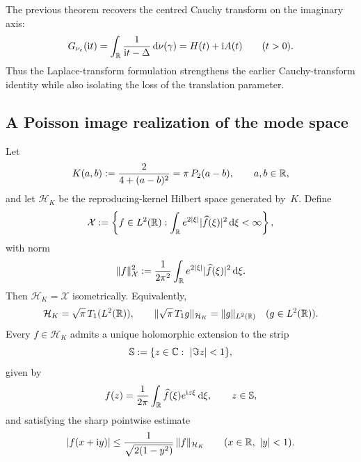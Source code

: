 \begin{remark}
The previous theorem recovers the centred Cauchy transform on the
imaginary axis:
\[
G_{\nu_c}(\mathrm{i} t)
=\int_{\mathbb{R}}\frac{1}{\mathrm{i} t-\Delta}\,\mathrm{d}\nu(\gamma)
=H(t)+\mathrm{i} A(t)
\qquad(t>0).
\]
Thus the Laplace-transform formulation strengthens the earlier
Cauchy-transform identity while also isolating the loss of the translation
parameter.
\end{remark}

\subsection{A Poisson image realization of the mode space}

\begin{proposition}%
\label{thm:gram-space-poisson-image}
Let
\[
K(a,b):=\frac{2}{4+(a-b)^2}=\pi\,P_2(a-b),
\qquad a,b\in\mathbb{R},
\]
and let $\mathcal H_K$ be the reproducing-kernel Hilbert space generated
by~$K$.  Define
\[
\mathcal X
:=
\left\{
f\in L^2(\mathbb{R}):
\int_{\mathbb{R}}e^{2|\xi|}\lvert \widehat f(\xi)\rvert^2\,\mathrm{d}\xi<\infty
\right\},
\]
with norm
\[
\|f\|_{\mathcal X}^2
:=\frac{1}{2\pi^2}\int_{\mathbb{R}}e^{2|\xi|}\lvert \widehat f(\xi)\rvert^2\,\mathrm{d}\xi.
\]
Then $\mathcal H_K=\mathcal X$ isometrically.  Equivalently,
\[
\mathcal H_K=\sqrt{\pi}\,T_1(L^2(\mathbb{R})),
\qquad
\|\sqrt{\pi}\,T_1 g\|_{\mathcal H_K}=\|g\|_{L^2(\mathbb{R})}
\quad(g\in L^2(\mathbb{R})).
\]
Every $f\in\mathcal H_K$ admits a unique holomorphic extension to the
strip
\[
\mathbb S:=\{z\in\mathbb{C}:\ |\Im z|<1\},
\]
given by
\[
f(z)=\frac{1}{2\pi}\int_{\mathbb{R}}\widehat f(\xi)e^{\mathrm{i} z\xi}\,\mathrm{d}\xi,
\qquad z\in\mathbb S,
\]
and satisfying the sharp pointwise estimate
\[
|f(x+\mathrm{i} y)|\le \frac{1}{\sqrt{2(1-y^2)}}\,\|f\|_{\mathcal H_K}
\qquad(x\in\mathbb{R},\ |y|<1).
\]
\end{proposition}

